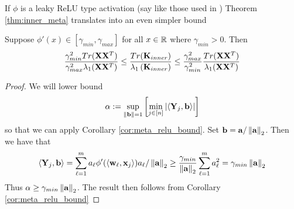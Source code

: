 \par
If $\phi$ is a leaky ReLU type activation (say like those used in \cite{marco}) Theorem \ref{thm:inner_meta} translates into an even simpler bound
\begin{corollary}
Suppose $\phi'(x) \in [\gamma_{min}, \gamma_{max}]$ for all $x \in \mathbb{R}$ where $\gamma_{min} > 0$.  Then
\[\frac{\gamma_{min}^2 Tr(\mathbf{X} \mathbf{X}^T)}{\gamma_{max}^2 \lambda_1(\mathbf{X} \mathbf{X}^T)} \leq \frac{Tr(\mathbf{K}_{inner})}{\lambda_1 \left(\mathbf{K}_{inner}\right)} \leq \frac{\gamma_{max}^2}{\gamma_{min}^2} \frac{Tr(\mathbf{X} \mathbf{X}^T)}{\lambda_1(\mathbf{X} \mathbf{X}^T)} \]
\end{corollary}
\begin{proof}
We will lower bound
\[ \alpha := \sup_{\left\lVert\mathbf b\right\rVert = 1} \left[\min_{j \in [n]} |\langle \mathbf{Y}_j, \mathbf b \rangle|\right] \]
so that we can apply Corollary \ref{cor:meta_relu_bound}.  Set $\mathbf b = \mathbf{a} / \left\lVert\mathbf{a}\right\rVert_2$.  Then we have that
\[ \langle \mathbf{Y}_j, \mathbf b \rangle = \sum_{\ell = 1}^m a_\ell \phi'(\langle \mathbf{w}_\ell, \mathbf{x}_j \rangle) a_\ell / \left\lVert\mathbf{a}\right\rVert_2 \geq \frac{\gamma_{min}}{\left\lVert\mathbf{a}\right\rVert_2} \sum_{\ell = 1}^m a_\ell^2 = \gamma_{min} \left\lVert\mathbf{a}\right\rVert_2 \]
Thus $\alpha \geq \gamma_{min} \left\lVert\mathbf{a}\right\rVert_2$.  The result then follows from Corollary \ref{cor:meta_relu_bound}
\end{proof}

